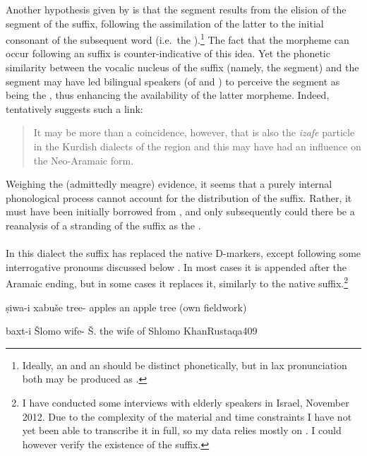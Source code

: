 Another hypothesis given by \citet[168]{KhanArbel} is that the  segment results from the elision of the  segment of the \cst* \ed suffix, following the assimilation of the latter to the initial consonant of the subsequent word (i.e.\ the \secn).\footnote{Ideally, an  and an  should be distinct phonetically, but in lax pronunciation both may be produced as \phonetic[ɪ].} The fact that the  morpheme can occur following an \ed suffix is counter-indicative of this idea. Yet the phonetic similarity between the vocalic nucleus of the \ed suffix (namely, the  segment) and the  segment may have led bilingual speakers (of \Sor and ) to perceive the  segment as being the  \ez*, thus enhancing the availability of the latter morpheme. Indeed, \citet[169]{KhanArbel} tentatively suggests such a link: \blockquote{It may be more than a coincidence, however, that  is also the \textit{izafe} particle in the Kurdish dialects of the region \citep[61--64]{MacKenzie} and this may have had an influence on the Neo-Aramaic form.} Weighing the (admittedly meagre) evidence, it seems that a purely internal phonological process cannot account for the distribution of the  suffix. Rather, it must have been initially borrowed from \Sor, and only subsequently could there be a reanalysis of a stranding  of the \ed suffix as the \ez*. 

\paragraph{\Rus} In this dialect the \ez* suffix has replaced the native D-markers, except following some interrogative pronouns discussed below \citep[408f.]{KhanRustaqa}. In most cases it is appended after the Aramaic  ending, but in some cases it replaces it, similarly to the native \ed suffix.\footnote{I have conducted some interviews with elderly \Rus speakers in Israel, November 2012. Due to the complexity of the material and time constraints I have not yet been able to transcribe it in full, so my data relies mostly on \citet{KhanRustaqa}. I could however verify the existence of the \ez* suffix.}  

{ṣiwa-i xabuše}
{tree-\ez{} apples}
{an apple tree}
{}{(own fieldwork)}

{baxt-i Šlomo}
{wife-\ez{} Š.}
{the wife of Shlomo}
{KhanRustaqa}{409}

